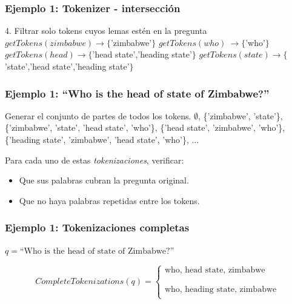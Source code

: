 \begin{frame}[t]
\frametitle{Ejemplo 1: Tokenizer - intersección}
4. Filtrar solo tokens cuyos lemas estén en la pregunta\newline
  \Large{
    $getTokens(zimbabwe) \rightarrow \{$'zimbabwe'$\}$\newline
    $getTokens(who)\ \rightarrow \{$'who'$\}$\newline
    $getTokens(head) \rightarrow \{$'head state','heading state'$\}$\newline
    $getTokens(state) \rightarrow  \{$'state','head state','heading state'$\}$
}
\end{frame}

\begin{frame}[t]
\frametitle{Ejemplo 1: ``Who is the head of state of Zimbabwe?''}
  Generar el conjunto de partes de todos los tokens.\newline
  \Large{
      $\emptyset$,\newline
      \{'zimbabwe', 'state'\},\newline
      \{'zimbabwe', 'state', 'head state', 'who'\},\newline
      \{'head state', 'zimbabwe', 'who'\},\newline
      \{'heading state', 'zimbabwe', 'head state', 'who'\},\newline
      ...
  }\newline

  \normalsize{Para cada uno de estas \textit{tokenizaciones}, verificar:
  \begin{itemize}
    \item Que sus palabras cubran la pregunta original.
    \item Que no haya palabras repetidas entre los tokens.
  \end{itemize}
  }
\end{frame}

\begin{frame}
\frametitle{Ejemplo 1: Tokenizaciones completas}

\begin{center}

$q = \text{``Who is the head of state of Zimbabwe?''}$
\end{center}
 \begin{equation*}
    CompleteTokenizations(q) = \begin{cases}
               \text{who, head state, zimbabwe} \\
               \\
               \\
               \text{who, heading state, zimbabwe} \\
           \end{cases}
\end{equation*}

\end{frame}

